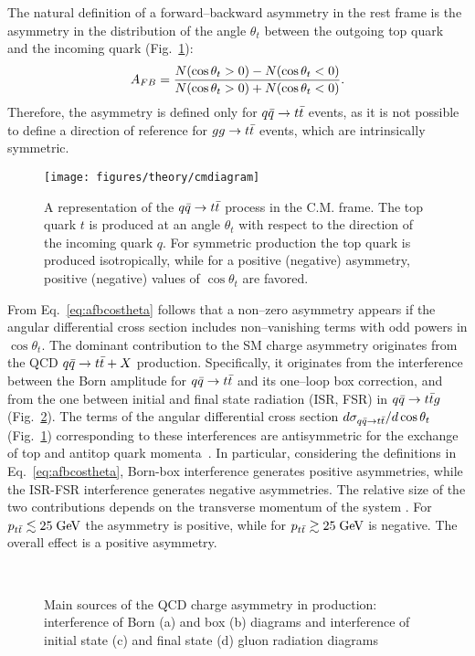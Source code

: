 The natural definition of a forward--backward asymmetry in the
\ttbar{} rest frame is the asymmetry in the distribution of the angle
$\theta_t$ between the outgoing top quark and the incoming quark
(Fig.~\ref{fig:cmdiagram}):
\begin{equation}
\label{eq:afbcostheta}
A_{FB}{}=\frac{N(\cos\theta_t>0)-N(\cos\theta_t<0)}{N(\cos\theta_t>0)+N(\cos\theta_t<0)}.
\end{equation}
Therefore, the asymmetry is defined only for \mbox{$q\bar{q}{}\to t\bar{t}{}$}
events, as it is not possible to define a direction of reference for
$gg\to t\bar{t}{}$ events, which are intrinsically symmetric.
\begin{figure}[!htb]\centering
  \texttt{[image: figures/theory/cmdiagram]}
  \caption{A representation of the $q\bar{q}{}\to t\bar{t}{}$ process in the
    C.M. frame. The top quark $t$ is produced at an angle $\theta_t$
    with respect to the direction of the incoming quark $q$. For
    symmetric production the top quark is produced isotropically,
    while for a positive (negative) asymmetry, positive (negative)
    values of $\cos\theta_t$ are favored. } 
  \label{fig:cmdiagram}
\end{figure}

From Eq.~\ref{eq:afbcostheta} follows that a non--zero asymmetry
appears if the angular differential cross section includes
non--vanishing terms with odd powers in $\cos\theta_t$.
The dominant contribution to the SM charge asymmetry originates from
the QCD \mbox{$q\bar{q}{}\to t\bar{t}{}+X$} production. Specifically, it originates from the
interference between the Born amplitude for \mbox{$q\bar{q}{}\to t\bar{t}{}$} and
its one--loop box correction, and from the one between initial and final
state radiation (ISR, FSR) in \mbox{$q\bar{q}{}\to{}t\bar{t}{}g$}
(Fig.~\ref{fig:asymdiagrams}). The terms of the angular differential cross section
$d\sigma_{q\bar{q}{}\to{}t\bar{t}{}}/d\cos\theta_t$ (Fig.~\ref{fig:cmdiagram})
corresponding to these interferences are antisymmetric for the
exchange of top and antitop quark momenta~\cite{Kuhn:1998kw}. In
particular, considering the definitions in Eq.~\ref{eq:afbcostheta},
Born-box interference generates positive asymmetries,
while the ISR-FSR interference generates negative asymmetries.
The relative size of the two contributions depends on the transverse
momentum of the \ttbar{} system \pttt{}. For
$p_{t\bar{t}}{}\lesssim{}25\; \mathrm{GeV}{}$ the asymmetry is positive, while for
$p_{t\bar{t}}{}\gtrsim{}25\; \mathrm{GeV}{}$ is negative. The overall effect is a
positive asymmetry.
\begin{figure}[!htb]
  \centering
   \quad
   \\
   \quad
  \caption{Main sources of the QCD charge asymmetry in \ttbar{}
    production: interference of Born (a) and box (b) diagrams and
    interference of initial state (c) and final state (d) gluon
    radiation diagrams}
  \label{fig:asymdiagrams}
\end{figure}

